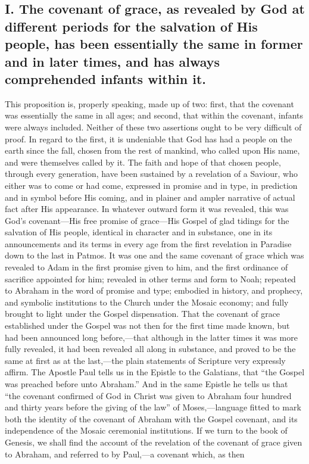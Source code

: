 \documentclass[]{book}
\begin{document}
\hypertarget{i.-the-covenant-of-grace-as-revealed-by-god-at-different-periods-for-the-salvation-of-his-people-has-been-essentially-the-same-in-former-and-in-later-times-and-has-always-comprehended-infants-within-it.}{%
\subsection{I. The covenant of grace, as revealed by God at different periods for the salvation of His people, has been essentially the same in former and in later times, and has always comprehended infants within it.}\label{i.-the-covenant-of-grace-as-revealed-by-god-at-different-periods-for-the-salvation-of-his-people-has-been-essentially-the-same-in-former-and-in-later-times-and-has-always-comprehended-infants-within-it.}}

This proposition is, properly speaking, made up of two: first, that the covenant was essentially the same in all ages; and second, that within the covenant, infants were always included. Neither of these two assertions ought to be very difficult of proof. In regard to the first, it is undeniable that God has had a people on the earth since the fall, chosen from the rest of mankind, who called upon His name, and were themselves called by it. The faith and hope of that chosen people, through every generation, have been sustained by a revelation of a Saviour, who either was to come or had come, expressed in promise and in type, in prediction and in symbol before His coming, and in plainer and ampler narrative of actual fact after His appearance. In whatever outward form it was revealed, this was God's covenant---His free promise of grace---His Gospel of glad tidings for the salvation of His people, identical in character and in substance, one in its announcements and its terms in every age from the first revelation in Paradise down to the last in Patmos. It was one and the same covenant of grace which was revealed to Adam in the first promise given to him, and the first ordinance of sacrifice appointed for him; revealed in other terms and form to Noah; repeated to Abraham in the word of promise and type; embodied in history, and prophecy, and symbolic institutions to the Church under the Mosaic economy; and fully brought to light under the Gospel dispensation. That the covenant of grace established under the Gospel was not then for the first time made known, but had been announced long before,---that although in the latter times it was more fully revealed, it had been revealed all along in substance, and proved to be the same at first as at the last,---the plain statements of Scripture very expressly affirm. The Apostle Paul tells us in the Epistle to the Galatians, that ``the Gospel was preached before unto Abraham.'' And in the same Epistle he tells us that ``the covenant confirmed of God in Christ was given to Abraham four hundred and thirty years before the giving of the law'' of Moses,---language fitted to mark both the identity of the covenant of Abraham with the Gospel covenant, and its independence of the Mosaic ceremonial institutions. If we turn to the book of Genesis, we shall find the account of the revelation of the covenant of grace given to Abraham, and referred to by Paul,---a covenant which, as then 
\end{document}
